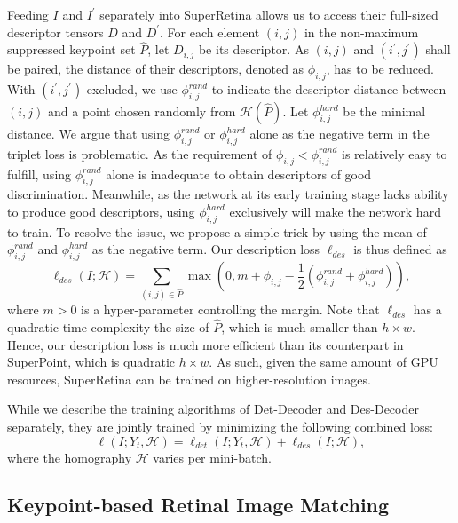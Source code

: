 Feeding $I$ and $I^\prime$ separately into SuperRetina allows us to access their full-sized descriptor tensors $D$ and $D^\prime$. For each element $(i,j)$ in the non-maximum suppressed keypoint set $\widehat{P}$, let $D_{i,j}$ be its descriptor. As $(i,j)$ and $(i^\prime, j^\prime)$ shall be paired, the distance of their descriptors, denoted as $\phi_{i,j}$, has to be reduced. With  $(i^\prime, j^\prime)$ excluded, we use $\phi^{rand}_{i,j}$ to indicate the descriptor distance between $(i,j)$ and a point chosen randomly from $\mathcal{H}(\widehat{P})$. Let $\phi^{hard}_{i,j}$ be  the minimal distance. 
We argue that using $\phi^{rand}_{i,j}$ or $\phi^{hard}_{i,j}$  alone as the negative term in the triplet loss is problematic. As the requirement of $\phi_{i,j}<\phi^{rand}_{i,j}$ is relatively easy to fulfill, using $\phi^{rand}_{i,j}$ alone is inadequate to obtain descriptors of good discrimination. Meanwhile, as the network at its early training stage lacks ability to produce good descriptors, using $\phi^{hard}_{i,j}$ exclusively will make the network hard to train. To resolve the issue, we propose a simple  trick by using the mean of  $\phi^{rand}_{i,j}$ and $\phi^{hard}_{i,j}$ as the negative term. Our description loss $\ell_{des}$ is thus defined as
\begin{equation} \label{eq:des-loss}
\ell_{des}(I; \mathcal{H})= \sum_{(i,j) \in \widehat{P}} \max (0, m+\phi_{i,j} -\frac{1}{2}(\phi^{rand}_{i,j}+\phi^{hard}_{i,j})),
\end{equation}
where $m>0$ is a hyper-parameter controlling the margin. Note that $\ell_{des}$ has a quadratic time complexity \wrt the size of $\widehat{P}$, which is much smaller than $h \times w$. Hence, our description loss is much more efficient than its counterpart in SuperPoint, which is quadratic  \wrt   $h \times w$. As such, given the same amount of GPU resources, SuperRetina can be trained on higher-resolution images.

While we describe the training algorithms of Det-Decoder and Des-Decoder separately, they are jointly trained by minimizing the following combined loss:
\begin{equation}
    \ell(I; Y_t, \mathcal{H}) = \ell_{det}(I; Y_t,  \mathcal{H}) + \ell_{des}(I; \mathcal{H}),
\end{equation}
where the homography $\mathcal{H}$ varies per mini-batch.  


\subsection{Keypoint-based Retinal Image Matching} \label{ssec:tasks}

